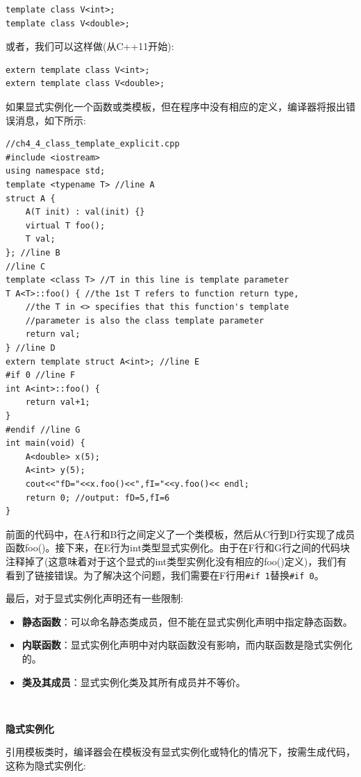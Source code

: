 \begin{lstlisting}[caption={}]
template class V<int>;
template class V<double>;
\end{lstlisting}

或者，我们可以这样做(从C++11开始): \par

\begin{lstlisting}[caption={}]
extern template class V<int>;
extern template class V<double>;
\end{lstlisting}

如果显式实例化一个函数或类模板，但在程序中没有相应的定义，编译器将报出错误消息，如下所示: \par

\begin{lstlisting}[caption={}]
//ch4_4_class_template_explicit.cpp
#include <iostream>
using namespace std;
template <typename T> //line A
struct A {
	A(T init) : val(init) {}
	virtual T foo();
	T val;
}; //line B
//line C
template <class T> //T in this line is template parameter
T A<T>::foo() { //the 1st T refers to function return type,
	//the T in <> specifies that this function's template
	//parameter is also the class template parameter
	return val;
} //line D
extern template struct A<int>; //line E
#if 0 //line F
int A<int>::foo() {
	return val+1;
}
#endif //line G
int main(void) {
	A<double> x(5);
	A<int> y(5);
	cout<<"fD="<<x.foo()<<",fI="<<y.foo()<< endl;
	return 0; //output: fD=5,fI=6
}
\end{lstlisting}

前面的代码中，在A行和B行之间定义了一个类模板，然后从C行到D行实现了成员函数foo()。接下来，在E行为int类型显式实例化。由于在F行和G行之间的代码块注释掉了(这意味着对于这个显式的int类型实例化没有相应的foo()定义)，我们有看到了链接错误。为了解决这个问题，我们需要在F行用\texttt{\#if 1}替换\texttt{\#if 0}。\par
最后，对于显式实例化声明还有一些限制: \par

\begin{itemize}
	\item \textbf{静态函数}：可以命名静态类成员，但不能在显式实例化声明中指定静态函数。
	\item \textbf{内联函数}：显式实例化声明中对内联函数没有影响，而内联函数是隐式实例化的。
	\item \textbf{类及其成员}：显式实例化类及其所有成员并不等价。
\end{itemize}

\noindent\textbf{}\ \par
\textbf{隐式实例化} \ \par
引用模板类时，编译器会在模板没有显式实例化或特化的情况下，按需生成代码，这称为隐式实例化: \par

